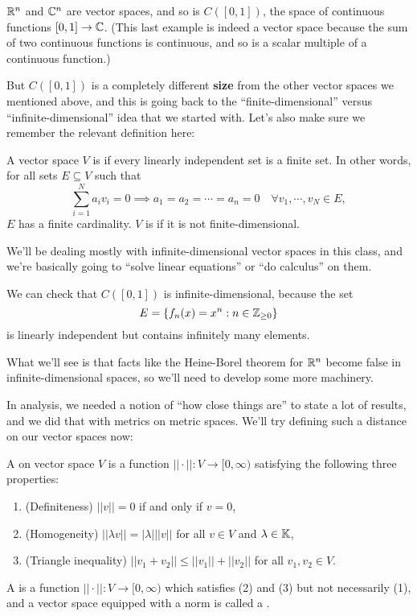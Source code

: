 \begin{example}
$\mathbb R^n$ and $\mathbb C^n$ are vector spaces, and so is $C([0, 1])$, the space of continuous functions $[0, 1] \to \mathbb C$. (This last example is indeed a vector space because the sum of two continuous functions is continuous, and so is a scalar multiple of a continuous function.)
\end{example}

But $C([0, 1])$ is a completely different \textbf{size} from the other vector spaces we mentioned above, and this is going back to the ``finite-dimensional'' versus ``infinite-dimensional'' idea that we started with. Let's also make sure we remember the relevant definition here:

\begin{definition}
A vector space $V$ is  if every linearly independent set is a finite set. In other words, for all sets $E \subseteq V$ such that 
\[
    \sum_{i=1}^N a_iv_i = 0 \implies a_1 = a_2 = \cdots = a_n = 0 \quad \forall v_1, \cdots, v_N \in E,
\]
$E$ has a finite cardinality. $V$ is  if it is not finite-dimensional.
\end{definition}

We'll be dealing mostly with infinite-dimensional vector spaces in this class, and we're basically going to ``solve linear equations'' or ``do calculus'' on them.

\begin{example}
We can check that $C([0, 1])$ is infinite-dimensional, because the set
\[
    E = \{f_n(x) = x^n: n \in \mathbb Z_{\ge 0}\}
\]
is linearly independent but contains infinitely many elements. 
\end{example}

What we'll see is that facts like the Heine-Borel theorem for $\mathbb R^n$ become false in infinite-dimensional spaces, so we'll need to develop some more machinery.

In analysis, we needed a notion of ``how close things are'' to state a lot of results, and we did that with metrics on metric spaces. We'll try defining such a distance on our vector spaces now:

\begin{definition}
A  on vector space $V$ is a function $||\cdot||: V \to [0, \infty)$ satisfying the following three properties:
\begin{enumerate}
    \item (Definiteness) $||v|| = 0$ if and only if $v = 0$,
    \item (Homogeneity) $||\lambda v|| = |\lambda| ||v||$ for all $v \in V$ and $\lambda \in \mathbb K$,
    \item (Triangle inequality) $||v_1+v_2|| \le ||v_1|| + ||v_2||$ for all $v_1, v_2 \in V$.
\end{enumerate}
A  is a function $||\cdot||: V \to [0, \infty)$ which satisfies (2) and (3) but not necessarily (1), and a vector space equipped with a norm is called a .
\end{definition}

